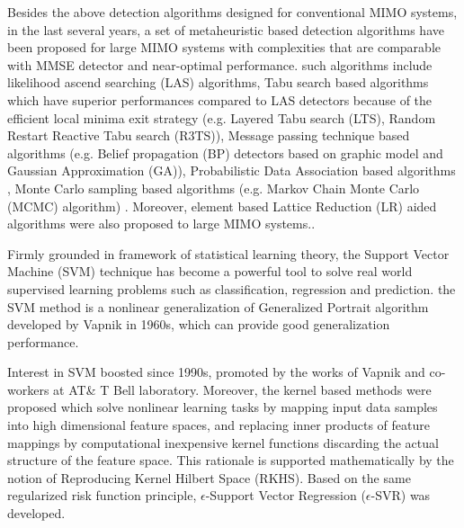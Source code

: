 \documentclass[12pt, draftclsnofoot, onecolumn]{IEEEtran}
\begin{document}
\begin{spacing}{2}
Besides the above detection algorithms designed for conventional MIMO systems, in the last several years, a set of metaheuristic based detection algorithms have been proposed for large MIMO systems with complexities that are comparable with MMSE detector and near-optimal performance. such algorithms include likelihood ascend searching (LAS) algorithms\cite{vardhan2008low}\cite{li2010multiple}, %
Tabu search based algorithms which have superior performances compared to LAS detectors because of the efficient local minima exit strategy (e.g. Layered Tabu search (LTS)\cite{srinidhi2011layered}, Random Restart Reactive Tabu search (R3TS)\cite{datta2010random}), Message passing technique based algorithms (e.g. Belief propagation (BP) detectors based on graphic model and Gaussian Approximation (GA)\cite{som2011low}\cite{som2010improved}\cite{narasimhan2014channel}\cite{goldberger2011mimo}), Probabilistic Data Association based algorithms \cite{mohammed2009low}, Monte Carlo sampling based algorithms (e.g. Markov Chain Monte Carlo (MCMC) algorithm\cite{datta2013novel}) . Moreover, element based Lattice Reduction (LR) aided algorithms were also proposed to  large MIMO systems.\cite{zhou2013element}.

Firmly grounded in framework of statistical learning theory, the Support Vector Machine (SVM) technique has become a powerful tool to solve real world supervised learning problems such as classification, regression and prediction. the SVM method is a nonlinear generalization of Generalized Portrait algorithm developed by Vapnik in 1960s\cite{vapnik1963pattern}\cite{vapnik1964note}, which can provide good generalization performance\cite{scholkopf2002learning}.

Interest in SVM boosted since 1990s, promoted by the works of Vapnik and co-workers at AT\& T Bell laboratory\cite{boser1992training}\cite{guyon1993automatic}\cite{vapnik2013nature}\cite{cortes1995support}\cite{scholkopf1996incorporating}\cite{vapnik1996support}.
Moreover, the kernel based methods\cite{scholkopf2002learning} were proposed which solve nonlinear learning tasks by mapping input data samples into high dimensional feature spaces, and replacing inner products of feature mappings by computational inexpensive kernel functions discarding the actual structure of the feature space. This rationale is supported mathematically by the notion of Reproducing Kernel Hilbert Space (RKHS). 
Based on the same regularized risk function principle, $\epsilon$-Support Vector Regression ($\epsilon$-SVR) was developed\cite{vapnik2013nature}\cite{smola2004tutorial}.


\end{spacing}
\end{document}

